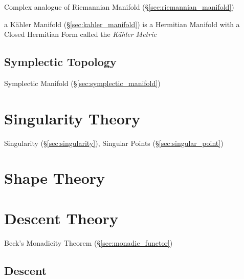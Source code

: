 Complex analogue of Riemannian Manifold (\S\ref{sec:riemannian_manifold})

a K\"ahler Manifold (\S\ref{sec:kahler_manifold}) is a Hermitian
Manifold with a Closed Hermitian Form called the \emph{K\"ahler
  Metric} %



\subsection{Symplectic Topology}\label{sec:symplectic_topology}

Symplectic Manifold (\S\ref{sec:symplectic_manifold})



\section{Singularity Theory}\label{sec:singularity_theory}

\fist Singularity (\S\ref{sec:singularity}), Singular Points
(\S\ref{sec:singular_point})



\section{Shape Theory}\label{sec:shape_theory}

\section{Descent Theory}\label{sec:descent_theory}

Beck's Monadicity Theorem (\S\ref{sec:monadic_functor})



\subsection{Descent}\label{sec:descent}

